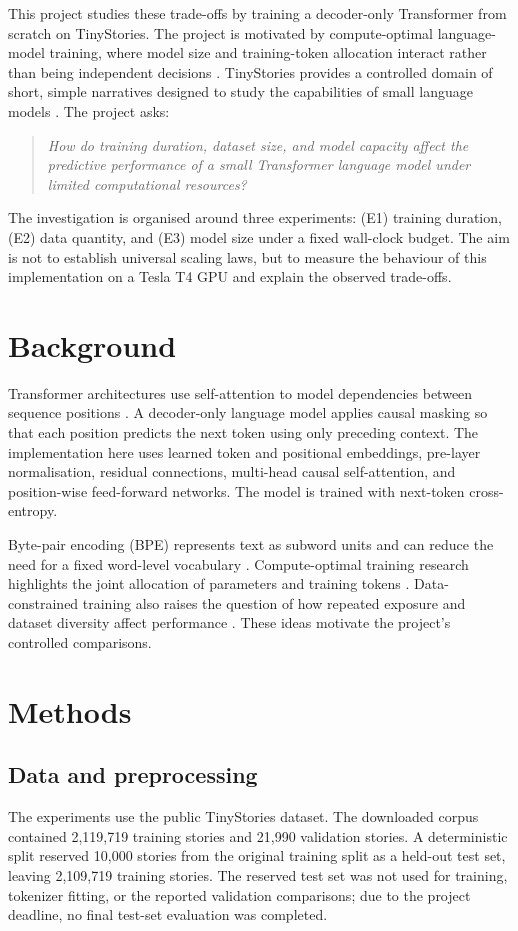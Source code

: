 \documentclass[10pt,a4paper]{article}
\begin{document}
This project studies these trade-offs by training a decoder-only Transformer from scratch on TinyStories. The project is motivated by compute-optimal language-model training, where model size and training-token allocation interact rather than being independent decisions \cite{hoffmann2022}. TinyStories provides a controlled domain of short, simple narratives designed to study the capabilities of small language models \cite{eldan2023}. The project asks:

\begin{quote}
\emph{How do training duration, dataset size, and model capacity affect the predictive performance of a small Transformer language model under limited computational resources?}
\end{quote}

The investigation is organised around three experiments: (E1) training duration, (E2) data quantity, and (E3) model size under a fixed wall-clock budget. The aim is not to establish universal scaling laws, but to measure the behaviour of this implementation on a Tesla T4 GPU and explain the observed trade-offs.

\section{Background}
Transformer architectures use self-attention to model dependencies between sequence positions \cite{vaswani2017}. A decoder-only language model applies causal masking so that each position predicts the next token using only preceding context. The implementation here uses learned token and positional embeddings, pre-layer normalisation, residual connections, multi-head causal self-attention, and position-wise feed-forward networks. The model is trained with next-token cross-entropy.

Byte-pair encoding (BPE) represents text as subword units and can reduce the need for a fixed word-level vocabulary \cite{sennrich2016}. Compute-optimal training research highlights the joint allocation of parameters and training tokens \cite{hoffmann2022}. Data-constrained training also raises the question of how repeated exposure and dataset diversity affect performance \cite{muennighoff2023}. These ideas motivate the project's controlled comparisons.

\section{Methods}
\subsection{Data and preprocessing}
The experiments use the public TinyStories dataset. The downloaded corpus contained 2,119,719 training stories and 21,990 validation stories. A deterministic split reserved 10,000 stories from the original training split as a held-out test set, leaving 2,109,719 training stories. The reserved test set was not used for training, tokenizer fitting, or the reported validation comparisons; due to the project deadline, no final test-set evaluation was completed.
\end{document}
